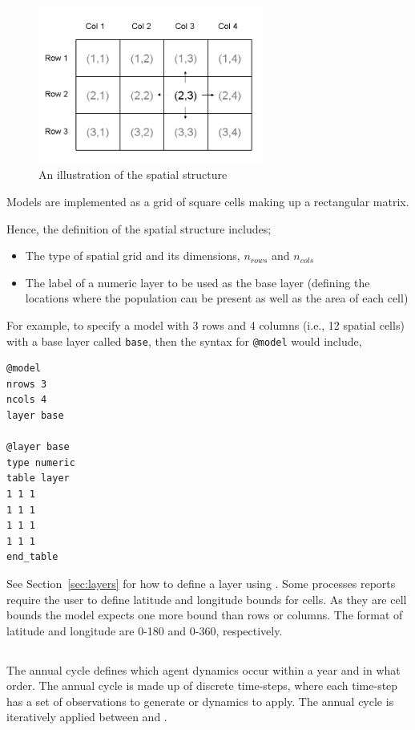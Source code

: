 \begin{figure}[htp]
	\centering
	\includegraphics[width=0.66\textwidth]{Figures/SquareStructure}
	\caption{An illustration of the spatial structure}
	\label{fig:SquareSpatialStructure}
\end{figure}

Models are implemented as a grid of square cells making up a rectangular matrix.

Hence, the definition of the spatial structure includes;
\begin{itemize}
	\item The type of spatial grid and its dimensions, $n_{rows}$ and $n_{cols}$
	\item The label of a numeric layer to be used as the base layer (defining the locations where the population can be present as well as the area of each cell)
\end{itemize}

For example, to specify a model with 3 rows and 4 columns (i.e., 12 spatial cells) with a base layer called \texttt{base}, then the syntax for \texttt{@model} would include,

{\small{\begin{verbatim}
@model
nrows 3
ncols 4
layer base
		
@layer base
type numeric
table layer
1 1 1 
1 1 1
1 1 1
1 1 1 
end_table		
\end{verbatim}}}

See Section~\ref{sec:layers} for how to define a layer using . Some processes reports require the user to define latitude and longitude bounds for cells. As they are cell bounds the model expects one more bound than rows or columns. The format of latitude and longitude are 0-180 and 0-360, respectively.


\subsection{}\label{sub:sec:annualcylc}
The annual cycle defines which agent dynamics occur within a year and in what order. The annual cycle is made up of discrete time-steps, where each time-step has a set of observations to generate or dynamics to apply. The annual cycle is iteratively applied between  and .

